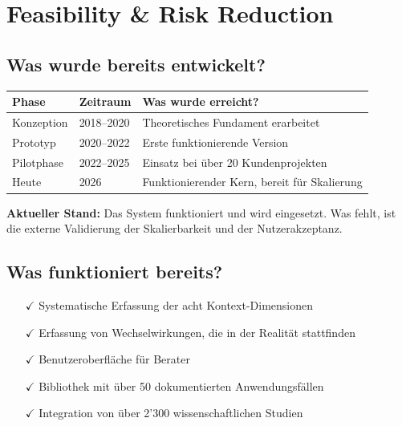 \documentclass[11pt,a4paper]{article}
\begin{document}
\newpage


\section{Feasibility \& Risk Reduction}

\subsection{Was wurde bereits entwickelt?}

\begin{table}[h]
\centering
\begin{tabular}{@{}L{3cm}L{3cm}L{7cm}@{}}
\toprule
\textbf{Phase} & \textbf{Zeitraum} & \textbf{Was wurde erreicht?} \\
\midrule
Konzeption & 2018--2020 & Theoretisches Fundament erarbeitet \\
Prototyp & 2020--2022 & Erste funktionierende Version \\
Pilotphase & 2022--2025 & Einsatz bei über 20 Kundenprojekten \\
Heute & 2026 & Funktionierender Kern, bereit für Skalierung \\
\bottomrule
\end{tabular}
\end{table}

\textbf{Aktueller Stand:} Das System funktioniert und wird eingesetzt. Was fehlt, ist die externe Validierung der Skalierbarkeit und der Nutzerakzeptanz.

\subsection{Was funktioniert bereits?}

\begin{itemize}
    \item[$\checkmark$] Systematische Erfassung der acht Kontext-Dimensionen
    \item[$\checkmark$] Erfassung von Wechselwirkungen, die in der Realität stattfinden
    \item[$\checkmark$] Benutzeroberfläche für Berater
    \item[$\checkmark$] Bibliothek mit über 50 dokumentierten Anwendungsfällen
    \item[$\checkmark$] Integration von über 2'300 wissenschaftlichen Studien
\end{itemize}
\end{document}
